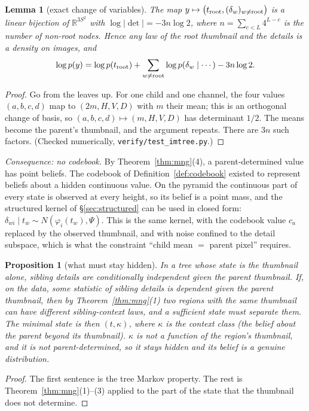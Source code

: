\documentclass[11pt]{article}
\newtheorem{proposition}[theorem]{Proposition}
\newtheorem{lemma}[theorem]{Lemma}
\theoremstyle{definition}
\newcommand{\R}{\mathbb R}
\begin{document}
\begin{lemma}[exact change of variables]\label{lem:haarjac}
The map $y\mapsto\big(t_{\rm root},(\delta_w)_{w\ne\rm root}\big)$ is a linear bijection of
$\R^{3S^2}$ with $\log\lvert\det\rvert=-3n\log2$, where $n=\sum_{c<L}4^{L-c}$ is the number of non-root nodes.
Hence any law of the root thumbnail and the details is a density on images, and
\[
\log p(y)=\log p(t_{\rm root})+\sum_{w\ne\rm root}\log p(\delta_w\mid\cdots)-3n\log2 .
\]
\end{lemma}
\begin{proof}
Go from the leaves up. For one child and one channel, the four values $(a,b,c,d)$ map to
$(2m,H,V,D)$ with $m$ their mean; this is an orthogonal change of basis, so $(a,b,c,d)\mapsto(m,H,V,D)$
has determinant $1/2$. The means become the parent's thumbnail, and the argument repeats. There are $3n$
such factors. (Checked numerically, \texttt{verify/test\_imtree.py}.)
\end{proof}

\noindent\emph{Consequence: no codebook.} By Theorem~\ref{thm:mng}(4), a parent-determined value has point
beliefs. The codebook of Definition~\ref{def:codebook} existed to represent beliefs about a hidden
continuous value. On the pyramid the continuous part of every state is observed at every height, so its
belief is a point mass, and the structured kernel of \S\ref{sec:structured} can be used in closed form:
$\delta_{wi}\mid t_w\sim N(\varphi_i(t_w),\Psi)$. This is the same kernel, with the codebook value $c_a$
replaced by the observed thumbnail, and with noise confined to the detail subspace, which is what the
constraint ``child mean $=$ parent pixel'' requires.

\begin{proposition}[what must stay hidden]\label{prop:hidden}
In a tree whose state is the thumbnail alone, sibling details are conditionally independent given the parent
thumbnail. If, on the data, some statistic of sibling details is dependent given the parent thumbnail, then by
Theorem~\ref{thm:mng}(1) two regions with the same thumbnail can have different sibling-context laws, and a
sufficient state must separate them. The minimal state is then $(t,\kappa)$, where $\kappa$ is the context class
(the belief about the parent beyond its thumbnail). $\kappa$ is not a function of the region's thumbnail, and it
is not parent-determined, so it stays hidden and its belief is a genuine distribution.
\end{proposition}
\begin{proof}
The first sentence is the tree Markov property. The rest is Theorem~\ref{thm:mng}(1)--(3) applied to the part
of the state that the thumbnail does not determine.
\end{proof}
\end{document}
